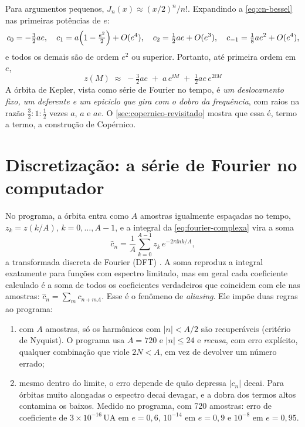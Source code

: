 Para argumentos pequenos, $J_n(x)\approx (x/2)^n/n!$. Expandindo a \autoref{eq:cn-bessel} nas primeiras potências de $e$:
\begin{equation}
  c_0 = -\tfrac32 ae,\quad
  c_1 = a\Bigl(1-\tfrac{e^2}{2}\Bigr) + O(e^4),\quad
  c_2 = \tfrac12 ae + O(e^3),\quad
  c_{-1} = \tfrac18 ae^2 + O(e^4),
  \label{eq:pequeno-e}
\end{equation}
e todos os demais são de ordem $e^2$ ou superior. Portanto, até primeira ordem em $e$,
\begin{equation}
  \boxed{\;z(M) \;\approx\; -\tfrac32 ae \;+\; a\,e^{\ii M} \;+\; \tfrac12 ae\,e^{2\ii M}\;}
  \label{eq:copernico-fourier}
\end{equation}
A órbita de Kepler, vista como série de Fourier no tempo, é \emph{um deslocamento fixo, um deferente e um epiciclo que gira com o dobro da frequência}, com raios na razão $\tfrac32 : 1 : \tfrac12$ vezes $a$, $a$ e $ae$. O \autoref{sec:copernico-revisitado} mostra que essa é, termo a termo, a construção de Copérnico.

\section{Discretização: a série de Fourier no computador}\label{sec:dft}

No programa, a órbita entra como $A$ amostras igualmente espaçadas no tempo, $z_k = z(k/A)$, $k=0,\dots,A-1$, e a integral da \autoref{eq:fourier-complexa} vira a soma
\begin{equation}
  \hat c_n = \frac{1}{A}\sum_{k=0}^{A-1} z_k\,e^{-2\pi\ii nk/A},
  \label{eq:dft}
\end{equation}
a transformada discreta de Fourier (DFT) \cite{press2007}. A soma reproduz a integral exatamente para funções com espectro limitado, mas em geral cada coeficiente calculado é a soma de todos os coeficientes verdadeiros que coincidem com ele nas amostras: $\hat c_n = \sum_{m} c_{n+mA}$. Esse é o fenômeno de \emph{aliasing}. Ele impõe duas regras ao programa:

\begin{enumerate}
  \item com $A$ amostras, só os harmônicos com $|n| < A/2$ são recuperáveis (critério de Nyquist). O programa usa $A = 720$ e $|n|\leq 24$ e \emph{recusa}, com erro explícito, qualquer combinação que viole $2N < A$, em vez de devolver um número errado;
  \item mesmo dentro do limite, o erro depende de quão depressa $|c_n|$ decai. Para órbitas muito alongadas o espectro decai devagar, e a dobra dos termos altos contamina os baixos. Medido no programa, com 720 amostras: erro de coeficiente de $3\times10^{-16}$\,UA em $e = 0{,}6$, $10^{-14}$ em $e = 0{,}9$ e $10^{-8}$ em $e = 0{,}95$.
\end{enumerate}

